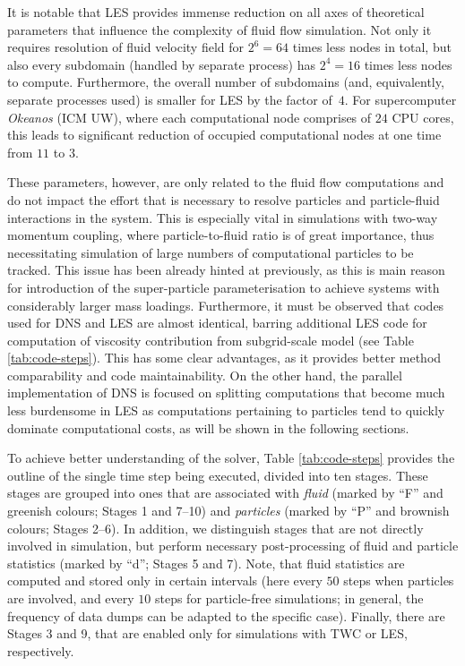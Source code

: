 \documentclass{pracamgren}
\begin{document}
It is notable that LES provides immense reduction on all axes of theoretical parameters that influence the complexity of fluid flow simulation.
Not only it requires resolution of fluid velocity field for $2^6 = 64$ times less nodes in total, but also every subdomain (handled by separate process) has $2^4 = 16$ times less nodes to compute.
Furthermore, the overall number of subdomains (and, equivalently, separate processes used) is smaller for LES by the factor of~$4$.
For supercomputer \emph{Okeanos} (ICM UW), where each computational node comprises of $24$ CPU cores, this leads to significant reduction of occupied computational nodes at one time from $11$ to $3$.

These parameters, however, are only related to the fluid flow computations and do not impact the effort that is necessary to resolve particles and particle-fluid interactions in the system.
This is especially vital in simulations with two-way momentum coupling, where particle-to-fluid ratio is of great importance, thus necessitating simulation of large numbers of computational particles to be tracked.
This issue has been already hinted at previously, as this is main reason for introduction of the super-particle parameterisation to achieve systems with considerably larger mass loadings.
Furthermore, it must be observed that codes used for DNS and LES are almost identical, barring additional LES code for computation of viscosity contribution from subgrid-scale model (see Table \ref{tab:code-steps}).
This has some clear advantages, as it provides better method comparability and code maintainability.
On the other hand, the parallel implementation of DNS is focused on splitting computations that become much less burdensome in LES as computations pertaining to particles tend to quickly dominate computational costs, as will be shown in the following sections.

\medskip

To achieve better understanding of the solver, Table \ref{tab:code-steps} provides the outline of the single time step being executed, divided into ten stages.
These stages are grouped into ones that are associated with \emph{fluid} (marked by ``F'' and greenish colours; Stages 1 and 7--10) and \emph{particles} (marked by ``P'' and brownish colours; Stages 2--6).
In addition, we distinguish stages that are not directly involved in simulation, but perform necessary post-processing of fluid and particle statistics (marked by ``d''; Stages 5 and 7).
Note, that fluid statistics are computed and stored only in certain intervals (here every $50$ steps when particles are involved, and every $10$ steps for particle-free simulations; in general, the frequency of data dumps can be adapted to the specific case).
Finally, there are Stages 3 and 9, that are enabled only for simulations with TWC or LES, respectively.
\end{document}
